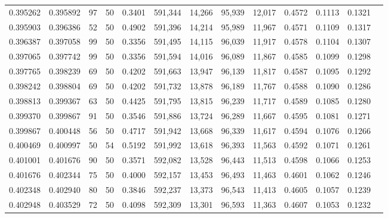 \begin{tabular}{rrrrrrrrrrrrr}
0.395262 & 0.395892 &    97 &  50 &                                     0.3401 & 591,344 &  14,266 &  95,939 &  12,017 & 0.4572 & 0.1113 & 0.1321 \\
0.395903 & 0.396386 &    52 &  50 &                                     0.4902 & 591,396 &  14,214 &  95,989 &  11,967 & 0.4571 & 0.1109 & 0.1317 \\
0.396387 & 0.397058 &    99 &  50 &                                     0.3356 & 591,495 &  14,115 &  96,039 &  11,917 & 0.4578 & 0.1104 & 0.1307 \\
0.397065 & 0.397742 &    99 &  50 &                                     0.3356 & 591,594 &  14,016 &  96,089 &  11,867 & 0.4585 & 0.1099 & 0.1298 \\
0.397765 & 0.398239 &    69 &  50 &                                     0.4202 & 591,663 &  13,947 &  96,139 &  11,817 & 0.4587 & 0.1095 & 0.1292 \\
0.398242 & 0.398804 &    69 &  50 &                                     0.4202 & 591,732 &  13,878 &  96,189 &  11,767 & 0.4588 & 0.1090 & 0.1286 \\
0.398813 & 0.399367 &    63 &  50 &                                     0.4425 & 591,795 &  13,815 &  96,239 &  11,717 & 0.4589 & 0.1085 & 0.1280 \\
0.399370 & 0.399867 &    91 &  50 &                                     0.3546 & 591,886 &  13,724 &  96,289 &  11,667 & 0.4595 & 0.1081 & 0.1271 \\
0.399867 & 0.400448 &    56 &  50 &                                     0.4717 & 591,942 &  13,668 &  96,339 &  11,617 & 0.4594 & 0.1076 & 0.1266 \\
0.400469 & 0.400997 &    50 &  54 &                                     0.5192 & 591,992 &  13,618 &  96,393 &  11,563 & 0.4592 & 0.1071 & 0.1261 \\
0.401001 & 0.401676 &    90 &  50 &                                     0.3571 & 592,082 &  13,528 &  96,443 &  11,513 & 0.4598 & 0.1066 & 0.1253 \\
0.401676 & 0.402344 &    75 &  50 &                                     0.4000 & 592,157 &  13,453 &  96,493 &  11,463 & 0.4601 & 0.1062 & 0.1246 \\
0.402348 & 0.402940 &    80 &  50 &                                     0.3846 & 592,237 &  13,373 &  96,543 &  11,413 & 0.4605 & 0.1057 & 0.1239 \\
0.402948 & 0.403529 &    72 &  50 &                                     0.4098 & 592,309 &  13,301 &  96,593 &  11,363 & 0.4607 & 0.1053 & 0.1232 \\

\end{tabular}
